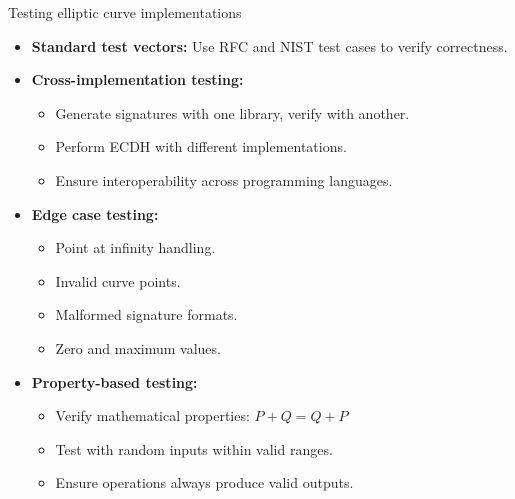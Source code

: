 \documentclass[aspectratio=169, lualatex, handout]{beamer}
\begin{document}
\begin{frame}{Testing elliptic curve implementations}
	\begin{itemize}[<+->]
		\item \textbf{Standard test vectors:} Use RFC and NIST test cases to verify correctness.
		\item \textbf{Cross-implementation testing:}
		      \begin{itemize}
			      \item Generate signatures with one library, verify with another.
			      \item Perform ECDH with different implementations.
			      \item Ensure interoperability across programming languages.
		      \end{itemize}
		\item \textbf{Edge case testing:}
		      \begin{itemize}
			      \item Point at infinity handling.
			      \item Invalid curve points.
			      \item Malformed signature formats.
			      \item Zero and maximum values.
		      \end{itemize}
		\item \textbf{Property-based testing:}
		      \begin{itemize}
			      \item Verify mathematical properties: $P + Q = Q + P$
			      \item Test with random inputs within valid ranges.
			      \item Ensure operations always produce valid outputs.
		      \end{itemize}
	\end{itemize}
\end{frame}
\end{document}
